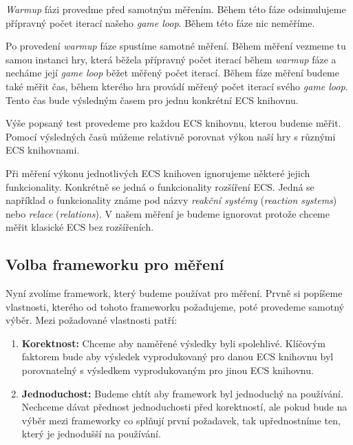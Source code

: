 \textit{Warmup} fázi provedme před samotným měřením. Během této fáze odsimulujeme přípravný počet iterací našeho \textit{game loop}. Během této fáze nic neměříme.

Po provedení \textit{warmup} fáze spustíme samotné měření. Během měření vezmeme tu samou instanci hry, která běžela přípravný počet iterací během \textit{warmup} fáze a necháme její \textit{game loop} běžet měřený počet iterací. Během fáze měření budeme také měřit čas, během kterého hra provádí měřený počet iterací svého \textit{game loop}. Tento čas bude výsledným časem pro jednu konkrétní ECS knihovnu.


Výše popsaný test provedeme pro každou ECS knihovnu, kterou budeme měřit. Pomocí výsledných časů můžeme relativně porovnat výkon naší hry s různými ECS knihovnami. 

Při měření výkonu jednotlivých ECS knihoven ignorujeme některé jejich funkcionality. Konkrétně se jedná o funkcionality rozšíření ECS. Jedná se například o funkcionality známe pod názvy \textit{reakční systémy} (\textit{reaction systems}) nebo \textit{relace} ({\textit{relations}}). V našem měření je budeme ignorovat protože chceme měřit klasické ECS bez rozšířeních.

\subsection{Volba frameworku pro měření}
\label{benchmark-framework}
Nyní zvolíme framework, který budeme používat pro měření. Prvně si popíšeme vlastnosti, kterého od tohoto frameworku požadujeme, poté provedeme samotný výběr. Mezi požadované vlastnosti patří:

\begin{enumerate}
    \item \textbf{Korektnost:} Chceme aby naměřené výsledky byli spolehlivé. Klíčovým faktorem bude aby výsledek vyprodukovaný pro danou ECS knihovnu byl porovnatelný s výsledkem vyprodukovaným pro jinou ECS knihovnu.
    \item \textbf{Jednoduchost:} Budeme chtít aby framework byl jednoduchý na používání. Nechceme dávat přednost jednoduchosti před korektností, ale pokud bude na výběr mezi frameworky co splňují první požadavek, tak upřednostníme ten, který je jednodušší na používání.
\end{enumerate}

